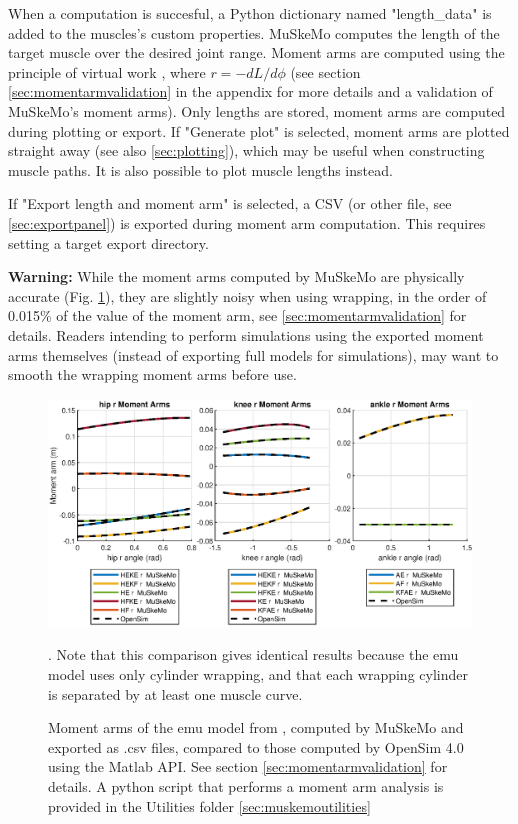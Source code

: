 \documentclass{article}
\begin{document}
When a computation is succesful, a Python dictionary named "length\_data" is added to the muscles's custom properties. MuSkeMo computes the length of the target muscle over the desired joint range. Moment arms are computed using the principle of virtual work \cite{storaceFunctionalAnalysisRole1979,anDeterminationMuscleOrientations1984}, where \(r = -dL / d\phi \) (see section \ref{sec:momentarmvalidation} in the appendix for more details and a validation of MuSkeMo's moment arms). Only lengths are stored, moment arms are computed during plotting or export. If "Generate plot" is selected, moment arms are plotted straight away (see also \ref{sec:plotting}), which may be useful when constructing muscle paths. It is also possible to plot muscle lengths instead.

If "Export length and moment arm" is selected, a CSV (or other file, see \ref{sec:exportpanel}) is exported during moment arm computation. This requires setting a target export directory.

\textbf{Warning:} While the moment arms computed by MuSkeMo are physically accurate (Fig. \ref{fig:momentarmscombined}), they are slightly noisy when using wrapping, in the order of 0.015\% of the value of the moment arm, see \ref{sec:momentarmvalidation} for details. Readers intending to perform simulations using the exported moment arms themselves (instead of exporting full models for simulations), may want to smooth the wrapping moment arms before use.

\begin{figure}[htb]
    \centering
    \includegraphics[width=1\textwidth]{figures/HKA_momentarms_emu.eps} %
    \caption{Moment arms of the emu model from \cite{vanbijlertMusclecontrolledPhysicsSimulations2024}, computed by MuSkeMo and exported as .csv files, compared to those computed by OpenSim 4.0 using the Matlab API. See section \ref{sec:momentarmvalidation} for details. A python script that performs a moment arm analysis is provided in the Utilities folder \ref{sec:muskemoutilities}}. Note that this comparison gives identical results because the emu model uses only cylinder wrapping, and that each wrapping cylinder is separated by at least one muscle curve.
    \label{fig:momentarmscombined}
\end{figure}
\end{document}
